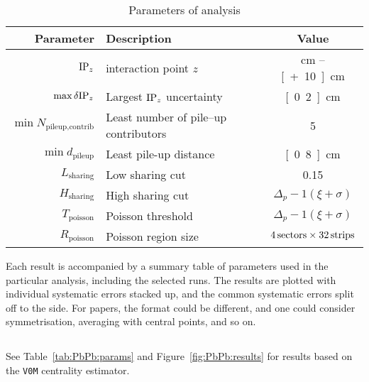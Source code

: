 \documentclass[compat,11pt]{alicenote}
\newcommand{\tabref}[1]{Table~\ref{#1}}
\newcommand{\figref}[1]{Figure~\ref{#1}}
\newcommand\headColor{\rowcolor{alicered!25!white}}
\newcommand\altRowColor{\rowcolor{aliceyellow!25!white}}
\begin{document}
\begin{table}
  \caption{Parameters of analysis}
  \centering
  \begin{tabular}[t]{|rlc|}
    \hline
    \headColor{} 
    \textbf{Parameter}
    & \textbf{Description}
    & \textbf{Value}\\
    \hline 
    $\IPz$ 
    & interaction point $z$ 
    & \unit[-10]{cm} -- \unit[+10]{cm}\\
    \altRowColor{}
    $\max{\delta\IPz}$ 
    & Largest $\IPz$ uncertainty 
    & \unit[0.2]{cm}\\
    $\min{N_{\text{pileup,contrib}}}$ 
    & Least number of pile--up contributors 
    & 5\\
    \altRowColor{}
    $\min{d_{\text{pileup}}}$ 
    & Least pile-up distance 
    & \unit[0.8]{cm}\\
    \hline 
    $L_{\text{sharing}}$ 
    & Low sharing cut 
    & 0.15\\
    \altRowColor{}
    $H_{\text{sharing}}$ 
    & High sharing cut 
    & $\Delta_p-1(\xi+\sigma)$ \\
    $T_{\text{poisson}}$ 
    & Poisson threshold 
    & $\Delta_p-1(\xi+\sigma)$ \\
    \altRowColor{}
    $R_{\text{poisson}}$ 
    & Poisson region size 
    & $\unit[4]{sectors} \times \unit[32]{strips}$\\
    \hline 
  \end{tabular}
  \label{tab:PbPb:param}
\end{table}


Each result is accompanied by a summary table of parameters used in
the particular analysis, including the selected runs.  The results are
plotted with individual systematic errors stacked up, and the common
systematic errors split off to the side.  For papers, the format could
be different, and one could consider symmetrisation, averaging with
central points,  and so on. 


\subsection{\PbPbCol{}}

See \tabref{tab:PbPb:params} and \figref{fig:PbPb:results} for results
based on the \texttt{V0M} centrality estimator. 
\end{document}
